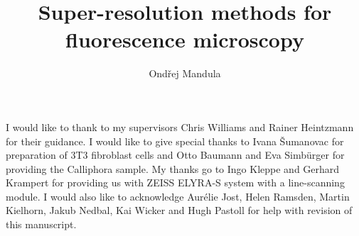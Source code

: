 \documentclass[phd,ianc,oneside,logo,leftchapter,12pt,doublespacing]{infthesis}
\title{Super-resolution methods for fluorescence microscopy}
\author{Ond\v rej Mandula}
\newcommand{\fix}{\marginpar{FIX}}
\newcommand{\home}{/Users/ondrejmandula/}
\begin{document}
\begin{preliminary}



\maketitle

\begin{acknowledgements}
I would like to thank to my supervisors Chris Williams and Rainer Heintzmann for their guidance. I would like to give special thanks to Ivana \v Sumanovac for preparation of 3T3 fibroblast cells and Otto Baumann and Eva Simb\" urger for providing the Calliphora sample. My thanks go to Ingo Kleppe and Gerhard Krampert for providing us with ZEISS ELYRA-S system with a line-scanning module. I would also like to acknowledge Aur\' elie Jost, Helen Ramsden, Martin Kielhorn, Jakub Nedbal, Kai Wicker and Hugh Pastoll for help with revision of this manuscript. 
\end{acknowledgements}

\standarddeclaration
{

\singlespace

\tableofcontents
}
\end{preliminary}






\appendix




%

%

\singlespace

\end{document}
